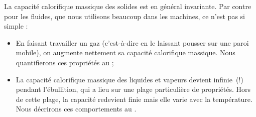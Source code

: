 		La capacité calorifique massique des solides est en général invariante. Par contre pour les fluides, que nous utilisons beaucoup dans les machines, ce n’est pas si simple :

		\begin{itemize}

			\item En faisant travailler un gaz (c’est-à-dire en le laissant pousser sur une paroi mobile), on augmente nettement sa capacité calorifique massique. Nous quantifierons ces propriétés au \coursquatre ;

			\item La capacité calorifique massique des liquides et vapeurs devient infinie~(!) pendant l’ébullition, qui a lieu sur une plage particulière de propriétés. Hors de cette plage, la capacité redevient finie mais elle varie avec la température. Nous décrirons ces comportements au \courscinq.

		\end{itemize}

